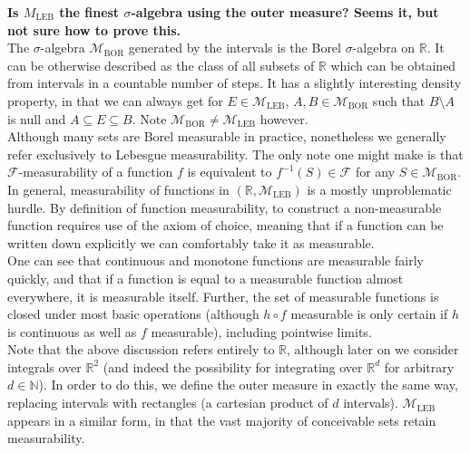 \documentclass{tikzposter} %
\begin{document}
\begin{columns}
{{  \textbf{Is $M_{\mathrm{LEB}}$ the finest $\sigma$-algebra using the outer measure? Seems it, but not sure how to prove this.} \\

  The $\sigma$-algebra $\mathcal{M}_{\mathrm{BOR}}$ generated by the intervals is the Borel $\sigma$-algebra on $\mathbb{R}$. It can be otherwise described as the class of all subsets of $\mathbb{R}$ which can be obtained from intervals in a countable number of steps. It has a slightly interesting density property, in that we can always get for $E \in \mathcal{M}_{\mathrm{LEB}}$, $A, B \in \mathcal{M}_{\mathrm{BOR}}$ such that $B \setminus A$ is null and $A \subseteq E \subseteq B$. Note $\mathcal{M}_{\mathrm{BOR}} \neq \mathcal{M}_{\mathrm{LEB}}$ however.\\

  Although many sets are Borel measurable in practice, nonetheless we generally refer exclusively to Lebesgue measurability. The only note one might make is that $\mathcal{F}$-measurability of a function $f$ is equivalent to $f^{-1}(S) \in \mathcal{F}$ for any $S \in \mathcal{M}_{\mathrm{BOR}}$. \\

  In general, measurability of functions in $(\mathbb{R}, \mathcal{M}_{\mathrm{LEB}})$ is a mostly unproblematic hurdle. By definition of function measurability, to construct a non-measurable function requires use of the axiom of choice, meaning that if a function can be written down explicitly we can comfortably take it as measurable. \\

  One can see that continuous and monotone functions are measurable fairly quickly, and that if a function is equal to a measurable function almost everywhere, it is measurable itself. Further, the set of measurable functions is closed under most basic operations (although $h \circ f$ measurable is only certain if $h$ is continuous as well as $f$ measurable), including pointwise limits. \\

  Note that the above discussion refers entirely to $\mathbb{R}$, although later on we consider integrals over $\mathbb{R}^{2}$ (and indeed the possibility for integrating over $\mathbb{R}^{d}$ for arbitrary $d \in \mathbb{N}$). In order to do this, we define the outer measure in exactly the same way, replacing intervals with rectangles (a cartesian product of $d$ intervals). $\mathcal{M}_{\mathrm{LEB}}$ appears in a similar form, in that the vast majority of conceivable sets retain measurability. \\

}}
\end{columns}
\end{document}
